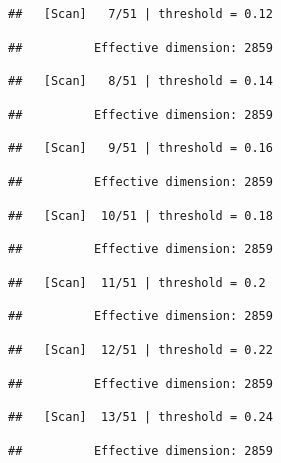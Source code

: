 \documentclass[
]{book}
\begin{document}
\begin{verbatim}
##   [Scan]   7/51 | threshold = 0.12
\end{verbatim}

\begin{verbatim}
##          Effective dimension: 2859
\end{verbatim}

\begin{verbatim}
##   [Scan]   8/51 | threshold = 0.14
\end{verbatim}

\begin{verbatim}
##          Effective dimension: 2859
\end{verbatim}

\begin{verbatim}
##   [Scan]   9/51 | threshold = 0.16
\end{verbatim}

\begin{verbatim}
##          Effective dimension: 2859
\end{verbatim}

\begin{verbatim}
##   [Scan]  10/51 | threshold = 0.18
\end{verbatim}

\begin{verbatim}
##          Effective dimension: 2859
\end{verbatim}

\begin{verbatim}
##   [Scan]  11/51 | threshold = 0.2
\end{verbatim}

\begin{verbatim}
##          Effective dimension: 2859
\end{verbatim}

\begin{verbatim}
##   [Scan]  12/51 | threshold = 0.22
\end{verbatim}

\begin{verbatim}
##          Effective dimension: 2859
\end{verbatim}

\begin{verbatim}
##   [Scan]  13/51 | threshold = 0.24
\end{verbatim}

\begin{verbatim}
##          Effective dimension: 2859
\end{verbatim}
\end{document}

